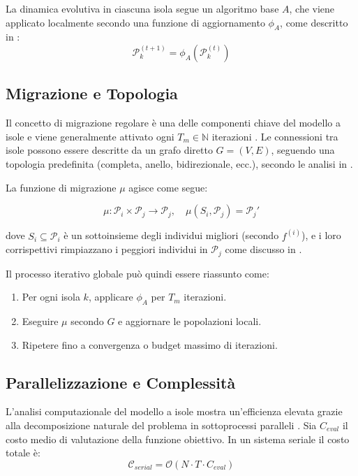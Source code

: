 \documentclass{article}
\begin{document}
La dinamica evolutiva in ciascuna isola segue un algoritmo base $A$, che viene applicato localmente 
secondo una funzione di aggiornamento $\phi_A$, come descritto in \cite{kennedy1995particle, engelbrecht2007computational}:
\begin{equation}
\mathcal{P}_k^{(t+1)} = \phi_A(\mathcal{P}_k^{(t)})
\end{equation}

\subsection{Migrazione e Topologia}

Il concetto di migrazione regolare è una delle componenti chiave del modello a isole e viene 
generalmente attivato ogni $T_m \in \mathbb{N}$ iterazioni \cite{tomassini2005spatially}. 
Le connessioni tra isole possono essere descritte da un grafo diretto $G = (V, E)$, seguendo una 
topologia predefinita (completa, anello, bidirezionale, ecc.), secondo le analisi in \cite{cantupaz1998survey}.

La funzione di migrazione $\mu$ agisce come segue:

\begin{equation}
\mu: \mathcal{P}_i \times \mathcal{P}_j \rightarrow \mathcal{P}_j, \quad \mu(S_i, \mathcal{P}_j) = \mathcal{P}_j'
\end{equation}

dove $S_i \subseteq \mathcal{P}_i$ è un sottoinsieme degli individui migliori (secondo $f^{(i)}$), e i loro 
corrispettivi rimpiazzano i peggiori individui in $\mathcal{P}_j$ come discusso in \cite{alba2002parallelism}.

Il processo iterativo globale può quindi essere riassunto come:

\begin{enumerate}
    \item Per ogni isola $k$, applicare $\phi_A$ per $T_m$ iterazioni.
    \item Eseguire $\mu$ secondo $G$ e aggiornare le popolazioni locali.
    \item Ripetere fino a convergenza o budget massimo di iterazioni.
\end{enumerate}

\subsection{Parallelizzazione e Complessità}

L'analisi computazionale del modello a isole mostra un'efficienza elevata grazie alla decomposizione 
naturale del problema in sottoprocessi paralleli \cite{alba2005parallel}. Sia $C_{eval}$ il costo medio 
di valutazione della funzione obiettivo. In un sistema seriale il costo totale è:
\begin{equation}
\mathcal{C}_{serial} = \mathcal{O}(N \cdot T \cdot C_{eval})
\end{equation}
\end{document}
